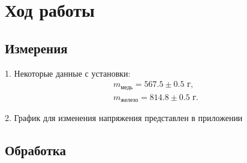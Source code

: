 \section{Ход работы}
\subsection{Измерения}

1. Некоторые данные с установки:
\begin{align*}
    m_\text{медь} = 567.5 \pm 0.5 \text{ г}, \\
    m_\text{железо} = 814.8 \pm 0.5 \text{ г}.
\end{align*}

2. График для изменения напряжения представлен в приложении
\subsection{Обработка}
